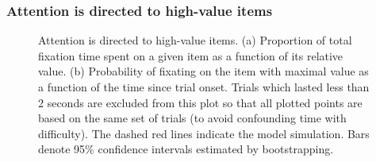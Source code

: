 \documentclass[12pt,a4paperpaper,]{article}
\begin{document}
\subsubsection{Attention is directed to high-value items}

\begin{figure}[t!]
  \centering
  \caption{Attention is directed to high-value items.
    (a) Proportion of total fixation time spent on a given item as a function of its relative value.
    (b) Probability of fixating on the item with maximal value as a function of the time since trial onset. Trials which lasted less than 2 seconds are excluded from this plot so that all plotted points are based on the same set of trials (to avoid confounding time with difficulty).
    The dashed red lines indicate the model simulation. Bars denote 95\% confidence intervals estimated by bootstrapping.
  }
  \label{fig:attend_to_value}
\end{figure}
\end{document}
